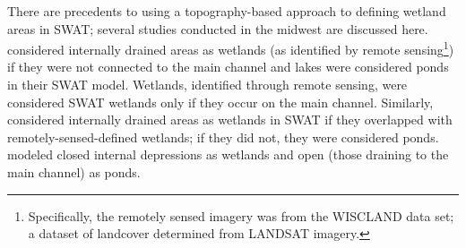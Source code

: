 	There are precedents to using a topography-based approach to defining wetland areas in SWAT; several studies conducted in the midwest are discussed here. \citet{almendinger_constructing_2007} considered internally drained areas as wetlands (as identified by remote sensing\footnote{Specifically, the remotely sensed imagery was from the WISCLAND data set; a dataset of landcover determined from LANDSAT imagery.}) if they were not connected to the main channel and lakes were considered ponds in their SWAT model. Wetlands, identified through remote sensing, were considered SWAT wetlands only if they occur on the main channel. Similarly, \citet{kirsch_predicting_2002} considered internally drained areas as wetlands in SWAT if they overlapped with remotely-sensed-defined wetlands; if they did not, they were considered ponds.  \citet{almendinger_constructing_2010} modeled closed internal depressions as wetlands and open (those draining to the main channel) as ponds.




